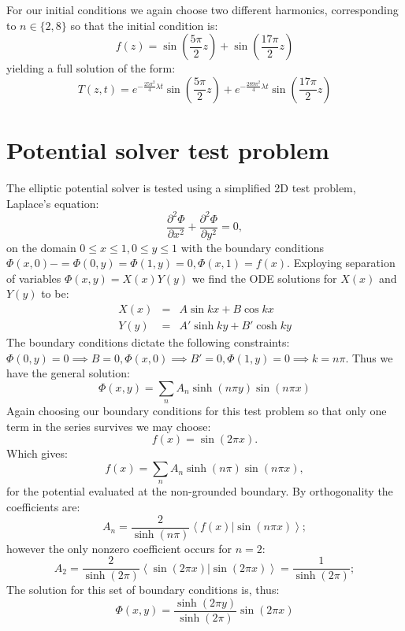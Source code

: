 \documentclass[11pt,letterpaper]{article}
\begin{document}
For our initial conditions we again choose two different harmonics, corresponding to $n \in \{ 2,8\}$ so that the initial condition is:
\begin{equation}
 f(z) = \sin \left( \frac{5\pi}{2} z \right) + \sin \left( \frac{17 \pi}{2} z \right)
\end{equation}
yielding a full solution of the form:
\begin{equation}
T(z,t) = e^{- \frac{25\pi^2}{4} \lambda t} \sin \left( \frac{5 \pi}{2} z \right)+e^{- \frac{289 \pi^2}{4} \lambda t} \sin \left( \frac{17 \pi}{2} z \right)
\end{equation}


\section{Potential solver test problem}

The elliptic potential solver is tested using a simplified 2D test problem, Laplace's equation:
\begin{equation}
\frac{\partial^2 \Phi}{\partial x^2} + \frac{\partial^2 \Phi}{\partial y^2} = 0, 
\end{equation}
on the domain $0 \le x \le 1, 0 \le y \le 1$ with the boundary conditions $\Phi(x,0)-=\Phi(0,y)=\Phi(1,y)=0, \Phi(x,1)=f(x)$.  Exploying separation of variables $\Phi(x,y)=X(x)Y(y)$ we find the ODE solutions for $X(x)$ and $Y(y)$ to be:
\begin{eqnarray}
X(x) &=& A \sin kx + B \cos kx \\
Y(y) &=& A' \sinh ky + B' \cosh ky
\end{eqnarray}
The boundary conditions dictate the following constraints:  $\Phi(0,y)=0 \implies B=0, \Phi(x,0) \implies B'=0, \Phi(1,y)=0 \implies k=n \pi$.  Thus we have the general solution:
\begin{equation}
\Phi(x,y) = \sum_n A_n \sinh (n \pi y) \sin (n \pi x)
\end{equation}
Again choosing our boundary conditions for this test problem so that only one term in the series survives we may choose:
\begin{equation}
f(x) = \sin(2 \pi x).
\end{equation}
Which gives:
\begin{equation}
f(x) = \sum_n A_n \sinh (n \pi) \sin (n \pi x),
\end{equation}
for the potential evaluated at the non-grounded boundary.  By orthogonality the coefficients are:  
\begin{equation}
A_n = \frac{2}{\sinh (n \pi)} \left< f(x) | \sin (n \pi x) \right>; 
\end{equation}
however the only nonzero coefficient occurs for $n=2$:
\begin{equation}
A_2 = \frac{2}{\sinh (2 \pi)} \left< \sin(2 \pi x) | \sin (2 \pi x) \right> = \frac{1}{\sinh(2 \pi)}; 
\end{equation}
The solution for this set of boundary conditions is, thus: 
\begin{equation}
\Phi(x,y) = \frac{\sinh (2 \pi y)}{\sinh(2 \pi)} \sin (2 \pi x)
\end{equation}
\end{document}

